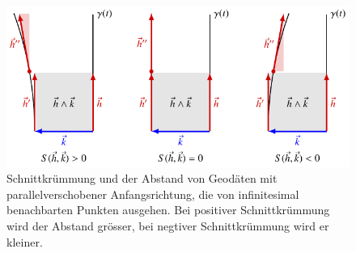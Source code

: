 %
%
%
\begin{figure}
\centering
\includegraphics{chapters/110-kruemmung/images/abstand.pdf}
\caption{Schnittkrümmung und der Abstand von Geodäten mit
parallelverschobener Anfangsrichtung, die von infinitesimal
benachbarten Punkten ausgehen.
Bei positiver Schnittkrümmung wird der Abstand grösser, bei negtiver
Schnittkrümmung wird er kleiner.
\label{buch:kruemmung:schnittkruemmung:fig:abstand}}
\end{figure}
